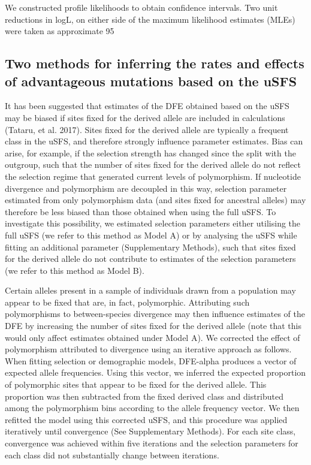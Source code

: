 We constructed profile likelihoods to obtain confidence intervals. Two unit reductions in logL, on either side of the maximum likelihood estimates (MLEs) were taken as approximate 95%

\subsection{Two methods for inferring the rates and effects of advantageous mutations based on the uSFS}

It has been suggested that estimates of the DFE obtained based on the uSFS may be biased if sites fixed for the derived allele are included in calculations (Tataru, et al. 2017). Sites fixed for the derived allele are typically a frequent class in the uSFS, and therefore strongly influence parameter estimates. Bias can arise, for example, if the selection strength has changed since the split with the outgroup, such that the number of sites fixed for the derived allele do not reflect the selection regime that generated current levels of polymorphism. If nucleotide divergence and polymorphism are decoupled in this way, selection parameter estimated from only polymorphism data (and sites fixed for ancestral alleles) may therefore be less biased than those obtained when using the full uSFS. To investigate this possibility, we estimated selection parameters either utilising the full uSFS (we refer to this method as Model A) or by analysing the uSFS while fitting an additional parameter (Supplementary Methods), such that sites fixed for the derived allele do not contribute to estimates of the selection parameters (we refer to this method as Model B). 

Certain alleles present in a sample of individuals drawn from a population may appear to be fixed that are, in fact, polymorphic. Attributing such polymorphisms to between-species divergence may then influence estimates of the DFE by increasing the number of sites fixed for the derived allele (note that this would only affect estimates obtained under Model A). We corrected the effect of polymorphism attributed to divergence using an iterative approach as follows. When fitting selection or demographic models, DFE-alpha produces a vector of expected allele frequencies. Using this vector, we inferred the expected proportion of polymorphic sites that appear to be fixed for the derived allele. This proportion was then subtracted from the fixed derived class and distributed among the polymorphism bins according to the allele frequency vector. We then refitted the model using this corrected uSFS, and this procedure was applied iteratively until convergence (See Supplementary Methods). For each site class, convergence was achieved within five iterations and the selection parameters for each class did not substantially change between iterations. 
	
